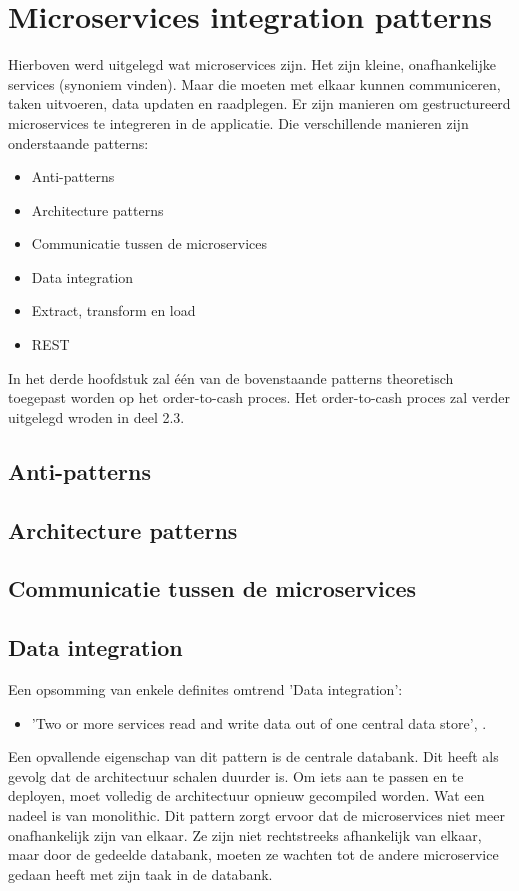 \section{Microservices integration patterns}
Hierboven werd uitgelegd wat microservices zijn. Het zijn kleine, onafhankelijke services (synoniem vinden). Maar die moeten met elkaar kunnen communiceren, taken uitvoeren, data updaten en raadplegen. Er zijn manieren om gestructureerd microservices te integreren in de applicatie.
Die verschillende manieren zijn onderstaande patterns:
\begin{itemize}
	\item Anti-patterns
	\item Architecture patterns
	\item Communicatie tussen de microservices
	\item Data integration
	\item Extract, transform en load
	\item REST	
\end{itemize}

In het derde hoofdstuk zal één van de bovenstaande patterns theoretisch toegepast worden op het order-to-cash proces. Het order-to-cash proces zal verder uitgelegd wroden in deel 2.3.
\subsection{Anti-patterns}
\subsection{Architecture patterns}
\subsection{Communicatie tussen de microservices}
\subsection{Data integration}
Een opsomming van enkele definites omtrend 'Data integration':
	\begin{itemize}
		\item 'Two or more services read and write data out of one central data store', \textcite{Aradhye2018}.
	\end{itemize}

Een opvallende eigenschap van dit pattern is de centrale databank. Dit heeft als gevolg dat de architectuur schalen duurder is. Om iets aan te passen en te deployen, moet volledig de architectuur opnieuw gecompiled worden. Wat een nadeel is van monolithic. Dit pattern zorgt ervoor dat de microservices niet meer onafhankelijk zijn van elkaar. Ze zijn niet rechtstreeks afhankelijk van elkaar, maar door de gedeelde databank, moeten ze wachten tot de andere microservice gedaan heeft met zijn taak in de databank.

